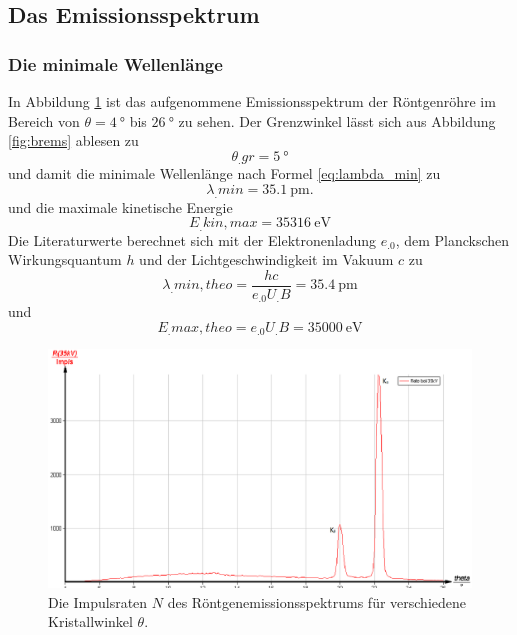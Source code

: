 \subsection{Das Emissionsspektrum}

\subsubsection{Die minimale Wellenlänge}
In Abbildung \ref{fig:emission} ist das aufgenommene Emissionsspektrum der Röntgenröhre im Bereich von $\theta=\SI{4}{\degree}$ bis $\SI{26}{\degree}$ zu sehen.
Der Grenzwinkel lässt sich aus Abbildung \ref{fig:brems} ablesen zu
\[\theta_.{gr}=\SI{5}{\degree}\]
und damit die minimale Wellenlänge nach Formel \eqref{eq:lambda_min} zu
\[
\lambda_.{min}=\SI{35,1}{\pico\metre}\text{.}
\]
und die maximale kinetische Energie
\[
E_.{kin,max}=\SI{35316}{\eV}
\]
Die Literaturwerte berechnet sich mit der Elektronenladung $e_.0$, dem Planckschen Wirkungsquantum $h$ und der Lichtgeschwindigkeit im Vakuum $c$ zu
\[
\lambda_.{min,theo}=\frac{hc}{e_.0U_.B}=\SI{35,4}{\pico\metre}
\]
und
\[
E_.{max,theo}=e_.0U_.B=\SI{35000}{\eV}
\]

\begin{figure}
\centering
\includegraphics[width=\linewidth-70pt,height=\textheight-70pt,keepaspectratio]{content/images/Spektrum.png}
\caption{Die Impulsraten $N$ des Röntgenemissionsspektrums für verschiedene Kristallwinkel $\theta$.}
\label{fig:emission}
\end{figure}

